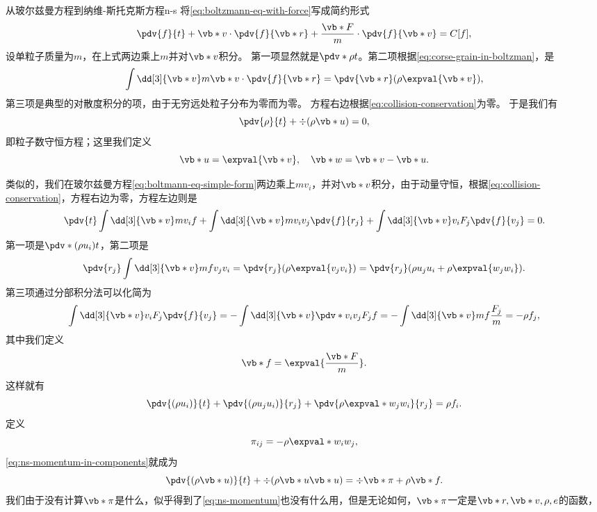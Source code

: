 \begin{back}{从玻尔兹曼方程到纳维-斯托克斯方程}{n-s}
    将\eqref{eq:boltzmann-eq-with-force}写成简约形式
    \begin{equation}
        \pdv{f}{t} + \vb*{v} \cdot \pdv{f}{\vb*{r}} + \frac{\vb*{F}}{m} \cdot \pdv{f}{\vb*{v}} = C[f],
        \label{eq:boltmann-eq-simple-form}
    \end{equation}
    设单粒子质量为$m$，在上式两边乘上$m$并对$\vb*{v}$积分。
    第一项显然就是$\pdv*{\rho}{t}$。第二项根据\eqref{eq:corse-grain-in-boltzman}，是
    \[
        \int \dd[3]{\vb*{v}} m \vb*{v} \cdot \pdv{f}{\vb*{r}} = \pdv{\vb*{r}} (\rho \expval{\vb*{v}}),
    \]
    第三项是典型的对散度积分的项，由于无穷远处粒子分布为零而为零。
    方程右边根据\eqref{eq:collision-conservation}为零。
    于是我们有
    \begin{equation}
        \pdv{\rho}{t} + \div{(\rho \vb*{u})} = 0,
        \label{eq:ns-particle}
    \end{equation}
    即粒子数守恒方程；这里我们定义
    \begin{equation}
        \vb*{u} = \expval{\vb*{v}}, \quad \vb*{w} = \vb*{v} - \vb*{u}.
        \label{eq:v-decomposite-u-w}
    \end{equation}
    
    类似的，我们在玻尔兹曼方程\eqref{eq:boltmann-eq-simple-form}两边乘上$m v_i$，并对$\vb*{v}$积分，由于动量守恒，根据\eqref{eq:collision-conservation}，方程右边为零，方程左边则是
    \[
        \pdv{t} \int \dd[3]{\vb*{v}} m v_i f + \int \dd[3]{\vb*{v}} m v_i v_j \pdv{f}{r_j} + \int \dd[3]{\vb*{v}} v_i F_j \pdv{f}{v_j} = 0.
    \]
    第一项是$\pdv*{(\rho u_i)}{t}$，第二项是
    \[
        \pdv{r_j} \int \dd[3]{\vb*{v}} mf v_j v_i = \pdv{r_j} (\rho \expval{v_j v_i}) = \pdv{r_j} (\rho u_j u_i + \rho \expval{w_j w_i}).
    \]
    第三项通过分部积分法可以化简为
    \[
        \int \dd[3]{\vb*{v}} v_i F_j \pdv{f}{v_j} = - \int \dd[3]{\vb*{v}} \pdv*{v_i}{v_j} F_j f = - \int \dd[3]{\vb*{v}} m f \frac{F_j}{m} = - \rho f_j,
    \]
    其中我们定义
    \begin{equation}
        \vb*{f} = \expval{\frac{\vb*{F}}{m}}.
    \end{equation}
    这样就有
    \begin{equation}
        \pdv{(\rho u_i)}{t} + \pdv{(\rho u_j u_i)}{r_j} + \pdv{\rho \expval*{w_j w_i}}{r_j} = \rho f_i.
        \label{eq:ns-momentum-in-components}
    \end{equation}
    定义
    \begin{equation}
        \pi_{ij} = - \rho \expval*{w_i w_j},
    \end{equation}
    \eqref{eq:ns-momentum-in-components}就成为
    \begin{equation}
        \pdv{(\rho \vb*{u})}{t} + \div{(\rho \vb*{u} \vb*{u})} = \div{\vb*{\pi}} + \rho \vb*{f}.
        \label{eq:ns-momentum}
    \end{equation}
    我们由于没有计算$\vb*{\pi}$是什么，似乎得到了\eqref{eq:ns-momentum}也没有什么用，但是无论如何，$\vb*{\pi}$一定是$\vb*{r}, \vb*{v}, \rho, e$的函数，


\end{back}
